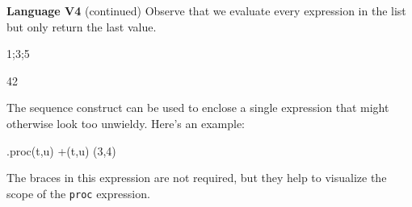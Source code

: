 \begin{minipage}[t]{\sw}
\slidenumber
\LARGE
{\bf Language V4} (continued)\exx
Observe that we evaluate every expression in the list
but only return the last value.
\begin{qv}
{1;3;5}

{42}
\end{qv}
The sequence construct can be used to enclose a single expression
that might otherwise look too unwieldy.
Here's an example:
\begin{qv}
.{proc(t,u) +(t,u)} (3,4)
\end{qv}
The braces in this expression are not required,
but they help to visualize the scope of the \verb'proc' expression.

\end{minipage}
